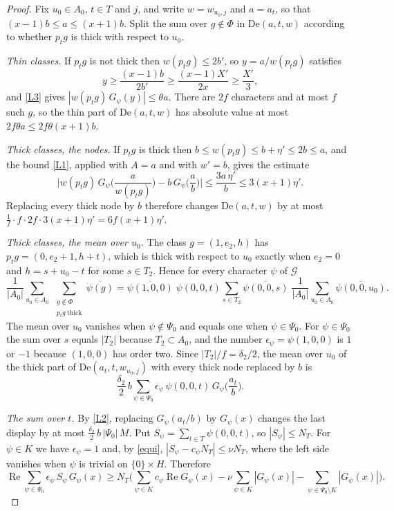 \documentclass[11pt,letterpaper]{article}
\numberwithin{equation}{section}
\begin{document}
\begin{proof}
Fix $u_0\in A_0$, $t\in T$ and $j$, and write $w=w_{u_0,j}$ and $a=a_t$, so that $(x-1)b\le a\le(x+1)b$. Split the sum over $g\notin\Phi$ in $\mathrm{De}(a,t,w)$ according to whether $p_tg$ is thick with respect to $u_0$.

\emph{Thin classes.} If $p_tg$ is not thick then $w(p_tg)\le2b'$, so $y=a/w(p_tg)$ satisfies
\[
y\ge\frac{(x-1)b}{2b'}\ge\frac{(x-1)X'}{2x}\ge\frac{X'}3 ,
\]
and \eqref{L3} gives $|w(p_tg)\,G_\psi(y)|\le\theta a$. There are $2f$ characters and at most $f$ such $g$, so the thin part of $\mathrm{De}(a,t,w)$ has absolute value at most $2f\theta a\le2f\theta(x+1)b$.

\emph{Thick classes, the nodes.} If $p_tg$ is thick then $b\le w(p_tg)\le b+\eta'\le2b\le a$, and the bound \eqref{L1}, applied with $A=a$ and with $w'=b$, gives the estimate
\[
\Big|w(p_tg)\,G_\psi\Big(\frac a{w(p_tg)}\Big)-b\,G_\psi\Big(\frac ab\Big)\Big|\le\frac{3a\,\eta'}b\le3(x+1)\eta' .
\]
Replacing every thick node by $b$ therefore changes $\mathrm{De}(a,t,w)$ by at most $\frac1f\cdot f\cdot2f\cdot3(x+1)\eta'=6f(x+1)\eta'$.

\emph{Thick classes, the mean over $u_0$.} The class $g=(1,e_2,h)$ has $p_tg=(0,e_2+1,h+t)$, which is thick with respect to $u_0$ exactly when $e_2=0$ and $h=s+u_0-t$ for some $s\in T_2$. Hence for every character $\psi$ of $\mathcal G$
\[
\frac1{|A_0|}\sum_{u_0\in A_0}\ \sum_{\substack{g\notin\Phi\\ p_tg\ \mathrm{thick}}}\overline{\psi(g)}
=\overline{\psi(1,0,0)}\;\psi(0,0,t)\sum_{s\in T_2}\overline{\psi(0,0,s)}\;\frac1{|A_0|}\sum_{u_0\in A_0}\overline{\psi(0,0,u_0)} .
\]
The mean over $u_0$ vanishes when $\psi\notin\Psi_0$ and equals one when $\psi\in\Psi_0$. For $\psi\in\Psi_0$ the sum over $s$ equals $|T_2|$ because $T_2\subset A_0$, and the number $\epsilon_\psi=\psi(1,0,0)$ is $1$ or $-1$ because $(1,0,0)$ has order two. Since $|T_2|/f=\delta_2/2$, the mean over $u_0$ of the thick part of $\mathrm{De}(a_t,t,w_{u_0,j})$ with every thick node replaced by $b$ is
\[
\frac{\delta_2}2\,b\sum_{\psi\in\Psi_0}\epsilon_\psi\,\psi(0,0,t)\,G_\psi\Big(\frac{a_t}b\Big).
\]

\emph{The sum over $t$.} By \eqref{L2}, replacing $G_\psi(a_t/b)$ by $G_\psi(x)$ changes the last display by at most $\frac{\delta_2}2\,b\,|\Psi_0|\,M$. Put $S_\psi=\sum_{t\in T}\psi(0,0,t)$, so $|S_\psi|\le N_T$. For $\psi\in K$ we have $\epsilon_\psi=1$ and, by \eqref{equi}, $|S_\psi-c_\psi N_T|\le\nu N_T$, where the left side vanishes when $\psi$ is trivial on $\{0\}\times H$. Therefore
\[
\operatorname{Re}\sum_{\psi\in\Psi_0}\epsilon_\psi\,S_\psi\,G_\psi(x)\ge N_T\Big(\sum_{\psi\in K}c_\psi\operatorname{Re}G_\psi(x)-\nu\sum_{\psi\in K}|G_\psi(x)|-\sum_{\psi\in\Psi_0\setminus K}|G_\psi(x)|\Big).
\]


\end{proof}
\end{document}
